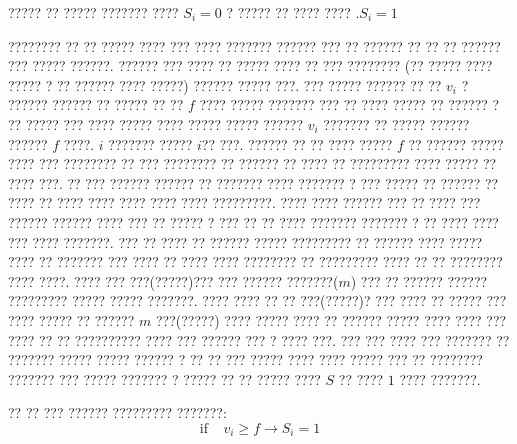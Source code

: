 ????? ?? ????? ??????? ???? $S_{i} = 0$  ? ????? ?? ???? ???? $.S_{i} = 1$ 

???????? ?? ?? ????? ???? ??? ???? ??????? ??????  ???  ?? ?????? ?? ?? ?? ??????  ??? ????? ??????.  ?????? ??? ???? ?? ????? ???? ?? ??? ???????? (?? ????? ???? ????? ? ?? ?????? ???? ?????) ?????? ????? ???. ??? ????? ?????? ?? ?? $v_{i}$ ? ?????? ?????? ?? ????? ?? ?? $f$  ???? ????? ??????? ??? ?? ???? ????? ?? ?????? ? ?? ????? ??? ???? ????? ???? ????? ????? ?????? $v_{i}$ ??????? ?? ????? ?????? ?????? $f$ ????. $i$ ??????? ????? $i$?? ???. ?????? ?? ?? ???? ????? $f$ ?? ?????? ????? ???? ??? ???????? ?? ??? ???????? ?? ?????? ?? ???? ?? ????????? ???? ????? ?? ???? ???. ?? ??? ?????? ?????? ?? ??????? ???? ??????? ? ??? ????? ?? ?????? ?? ???? ?? ???? ???? ???? ???? ???? ?????????. ???? ???? ?????? ??? ?? ???? ??? ?????? ?????? ???? ??? ?? ?????  ? ??? ?? ?? ???? ??????? ??????? ? ?? ???? ???? ??? ???? ???????. ??? ?? ???? ?? ?????? ????? ????????? ?? ?????? ???? ????? ???? ?? ??????? ??? ???? ?? ???? ???? ???????? ?? ????????? ???? ?? ?? ???????? ???? ????. ???? ??? ???(?????)??? ??? ?????? ???????($m$) ??? ?? ?????? ?????? ????????? ????? ????? ???????. ???? ???? ?? ?? ???(?????)? ??? ???? ?? ????? ??? ???? ????? ?? ?????? $m$ ???(?????) ???? ????? ???? ?? ?????? ????? ???? ???? ??? ???? ?? ?? ?????????? ???? ??? ?????? ??? ? ???? ???. ??? ??? ???? ??? ??????? ?? ??????? ????? ????? ?????? ? ?? ?? ??? ????? ???? ???? ????? ??? ?? ???????? ??????? ??? ????? ??????? ? ????? ?? ?? ????? ???? $S$  ?? ???? $1$ ???? ???????.

?? ?? ??? ?????? ????????? ???????: 
\begin{equation}
\text{if}~~~~~v_{i}\geq f \longrightarrow S_{i} = 1
\end{equation}


